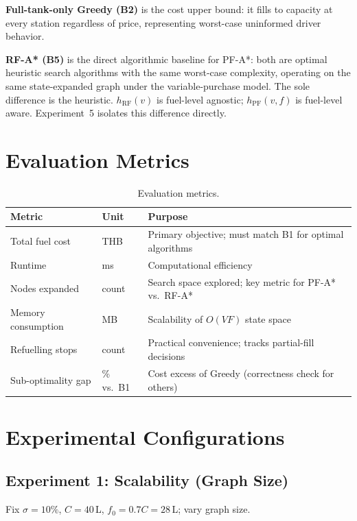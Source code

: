 \textbf{Full-tank-only Greedy (B2)} is the cost upper bound: it fills to capacity at every
station regardless of price, representing worst-case uninformed driver behavior.

\textbf{RF-A* (B5)} is the direct algorithmic baseline for PF-A*: both are optimal heuristic
search algorithms with the same worst-case complexity, operating on the same state-expanded
graph under the variable-purchase model.
The sole difference is the heuristic. $h_{\mathrm{RF}}(v)$ is fuel-level agnostic;
$h_{\mathrm{PF}}(v,f)$ is fuel-level aware.
Experiment~5 isolates this difference directly.

\section{Evaluation Metrics}

\begin{table}[ht]
\centering
\caption{Evaluation metrics.}
\label{tab:metrics}
\begin{tabular}{lll}
\toprule
Metric & Unit & Purpose \\
\midrule
Total fuel cost      & THB   & Primary objective; must match B1 for optimal algorithms \\
Runtime              & ms    & Computational efficiency \\
Nodes expanded       & count & Search space explored; key metric for PF-A* vs.\ RF-A* \\
Memory consumption   & MB    & Scalability of $O(VF)$ state space \\
Refuelling stops     & count & Practical convenience; tracks partial-fill decisions \\
Sub-optimality gap    & \% vs.\ B1 & Cost excess of Greedy (correctness check for others) \\
\bottomrule
\end{tabular}
\end{table}

\section{Experimental Configurations}

\subsection{Experiment 1: Scalability (Graph Size)}

Fix $\sigma=10\%$, $C=40$\,L, $f_0=0.7C=28$\,L; vary graph size.

